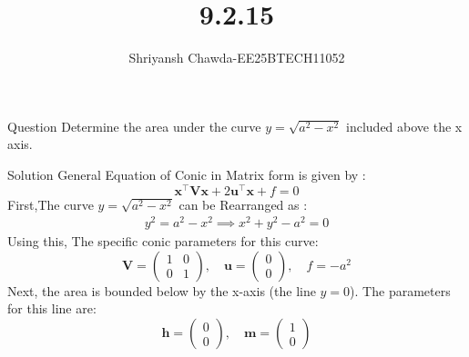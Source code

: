 \documentclass{beamer}
\title{9.2.15}
\author{Shriyansh Chawda-EE25BTECH11052}
\newcommand{\myvec}[1]{\ensuremath{\begin{pmatrix}#1\end{pmatrix}}}
\begin{document}
	

		\frame{\titlepage}
	
	
\begin{frame}{Question} 
Determine the area under the curve $y = \sqrt{a^2 - x^2}$ included above the  x axis.\\
\end{frame}
	
\begin{frame}{Solution}
General Equation of Conic in Matrix form is given by :
\begin{equation}
	\mathbf{x}^\top\mathbf{V}\mathbf{x} + 2\mathbf{u}^\top\mathbf{x} + f = 0
	\label{eq:matrix_conic}
\end{equation}
First,The  curve $y = \sqrt{a^2 - x^2}$ can be Rearranged as : 
\begin{align}
	y^2 = a^2 - x^2 \implies x^2 + y^2 - a^2 = 0
\end{align}
Using this, The specific conic parameters for this curve:
\begin{equation}
	\mathbf{V} = \myvec{1 & 0 \\ 0 & 1}, \quad \mathbf{u} = \myvec{0 \\ 0}, \quad f = -a^2
\end{equation}
Next, the area is bounded below by the x-axis (the line $y=0$). The parameters for this line are:
\begin{equation}
	\mathbf{h} = \myvec{0 \\ 0}, \quad \mathbf{m} = \myvec{1 \\ 0}
\end{equation}
\end{frame}
\end{document}
